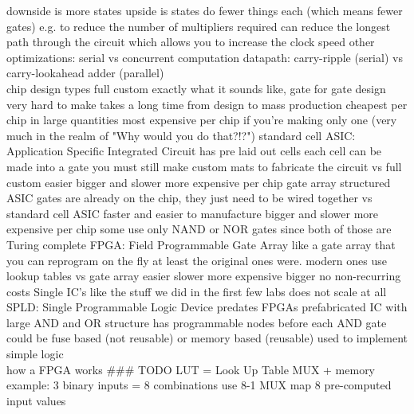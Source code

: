 \documentclass{article}
\begin{document}
\begin{multicols*}{2}
\begin{outline}[compactitem]
\3             downside is more states
\3             upside is states do fewer things each
\3             (which means fewer gates)
\2         e.g. to reduce the number of multipliers required
\2         can reduce the longest path through the circuit which allows you to increase the clock speed
\1     other optimizations:
\2         serial vs concurrent computation
\3             datapath: carry-ripple (serial) vs carry-lookahead adder (parallel)
\noindent \\ 
\0 chip design types
\1     full custom
\2         exactly what it sounds like, gate for gate design
\2         very hard to make
\2         takes a long time from design to mass production
\2         cheapest per chip in large quantities
\2         most expensive per chip if you're making only one
\3             (very much in the realm of "Why would you do that?!?")
\1     standard cell ASIC: Application Specific Integrated Circuit
\2         has pre laid out cells
\2         each cell can be made into a gate
\2         you must still make custom mats to fabricate the circuit
\2         vs full custom
\3             easier
\3             bigger and slower
\3             more expensive per chip
\1     gate array
\2         structured ASIC
\2         gates are already on the chip, they just need to be wired together
\2         vs standard cell ASIC
\3             faster and easier to manufacture
\3             bigger and slower
\3             more expensive per chip
\2         some use only NAND or NOR gates
\3             since both of those are Turing complete
\1     FPGA: Field Programmable Gate Array
\2         like a gate array that you can reprogram on the fly
\3             at least the original ones were.
\3             modern ones use lookup tables
\2         vs gate array
\3             easier
\3             slower
\3             more expensive
\3             bigger
\4                 no non-recurring costs
\1     Single IC's
\2         like the stuff we did in the first few labs
\2         does not scale at all
\1     SPLD: Single Programmable Logic Device
\2         predates FPGAs
\2         prefabricated IC with large AND and OR structure
\2         has programmable nodes before each AND gate
\3             could be fuse based (not reusable)
\3             or memory based (reusable)
\2         used to implement simple logic
\noindent \\ 
\0 how a FPGA works
\1     \#\#\# TODO
\1     LUT = Look Up Table
\2         MUX + memory
\2         example: 3 binary inputs = 8 combinations
\2         use 8-1 MUX map 8 pre-computed input values

\end{outline}
\end{multicols*}
\end{document}
